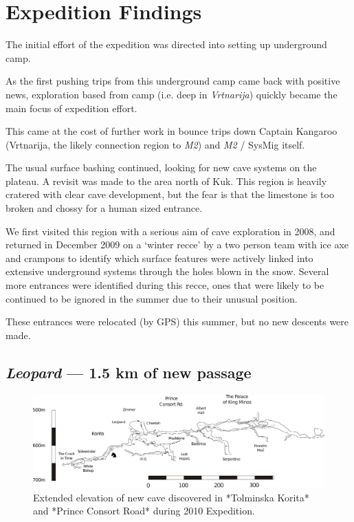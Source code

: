 \hypertarget{expedition-findings-1}{%
\section{Expedition Findings}\label{expedition-findings-1}}

The initial effort of the expedition was directed into setting up
underground camp.

As the first pushing trips from this underground camp came back with
positive news, exploration based from camp (i.e. deep in
\emph{Vrtnarija}) quickly became the main focus of expedition effort.

This came at the cost of further work in bounce trips down Captain
Kangaroo (Vrtnarija, the likely connection region to \emph{M2}) and
\emph{M2} / SysMig itself.

The usual surface bashing continued, looking for new cave systems on the
plateau. A revisit was made to the area north of Kuk. This region is
heavily cratered with clear cave development, but the fear is that the
limestone is too broken and chossy for a human sized entrance.

We first visited this region with a serious aim of cave exploration in
2008, and returned in December 2009 on a `winter recce' by a two person
team with ice axe and crampons to identify which surface features were
actively linked into extensive underground systems through the holes
blown in the snow. Several more entrances were identified during this
recce, ones that were likely to be continued to be ignored in the summer
due to their unusual position.

These entrances were relocated (by GPS) this summer, but no new descents
were made.

\hypertarget{leopard-1.5-km-of-new-passage}{%
\subsection{\texorpdfstring{\emph{Leopard} --- 1.5 km of new
passage}{Leopard --- 1.5 km of new passage}}\label{leopard-1.5-km-of-new-passage}}

\begin{figure}
\centering
\includegraphics[width=0.9\columnwidth]{2010/2010_new_stuff_extended_extraction}
\caption{Extended elevation of new cave discovered in *Tolminska Korita* and *Prince
Consort Road* during 2010 Expedition.}
\end{figure}

